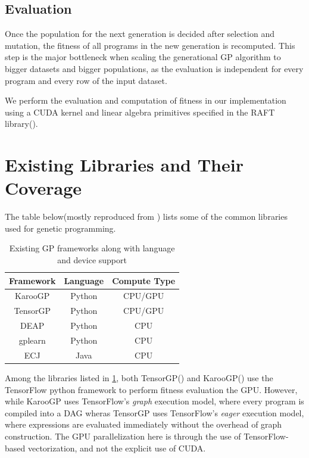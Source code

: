 \subsection{Evaluation}
\label{subsec:evaluation}
Once the population for the next generation is decided after selection and mutation, the fitness of all programs in the new generation is recomputed. This step is the major bottleneck when scaling the generational GP algorithm to bigger datasets and bigger populations, as the evaluation is independent for every program and every row of the input dataset. 

We perform the evaluation and computation of fitness in our implementation using a CUDA kernel and linear algebra primitives specified in the RAFT library(\citep{raschka2020machine}).

\section{Existing Libraries and Their Coverage}
\label{sec:otherlibs}
The table below(mostly reproduced from \cite{baeta2021speed}) lists some of the common libraries  used for genetic programming.  

\begin{table}[htbp]
  \caption{Existing GP frameworks along with language and device support}
  \begin{center}
      \begin{tabular}[c]{ccc}
          \toprule
          \textbf{Framework} &   \textbf{Language} & \textbf{Compute Type} \\
          \midrule
          KarooGP & Python & CPU/GPU \\
          TensorGP & Python & CPU/GPU \\
          DEAP & Python & CPU \\
          gplearn  & Python & CPU \\
          ECJ & Java & CPU \\
          \bottomrule
      \end{tabular}
      \label{tab:otherlibs}
  \end{center}
\end{table}

Among the libraries listed in \cref{tab:otherlibs}, both TensorGP(\citep{baeta2021tensorgp}) and KarooGP(\citep{staats2017tensorflow}) use the TensorFlow python framework to perform fitness evaluation the GPU. However, while KarooGP uses TensorFlow's \textit{graph} execution model, where every program is compiled into a DAG wheras TensorGP uses TensorFlow's \textit{eager} execution model\citep{agrawal2019tensorflow}, where expressions are evaluated immediately without the overhead of graph construction. The GPU parallelization here is through the use of TensorFlow-based vectorization, and not the explicit use of CUDA. 

